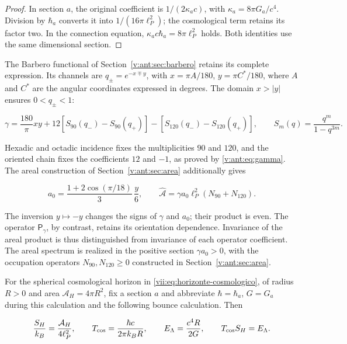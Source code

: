 \begin{proof}
In section \(a\), the original coefficient is \(1/(2\kappa_a c)\), with \(\kappa_a=8\pi G_a/c^4\). Division by \(\hbar_a\) converts it into \(1/(16\pi\ell_P^2)\); the cosmological term retains its factor two. In the connection equation, \(\kappa_a c\hbar_a=8\pi\ell_P^2\) holds. Both identities use the same dimensional section.
\end{proof}

The Barbero functional of Section~\ref{v:ant:sec:barbero} retains its complete expression. Its channels are \(q_\pm=e^{-x\mp y}\), with \(x=\pi A/180\), \(y=\pi C^*/180\), where \(A\) and \(C^*\) are the angular coordinates expressed in degrees. The domain \(x>|y|\) ensures \(0<q_\pm<1\):

\begin{equation}
\gamma=\frac{180}{\pi}xy+
12[S_{90}(q_-)-S_{90}(q_+)]
-[S_{120}(q_-)-S_{120}(q_+)],\qquad
S_m(q)=\frac{q^m}{1-q^{3m}}.
\label{nuc12:eq:4.4}
\end{equation}

Hexadic and octadic incidence fixes the multiplicities \(90\) and \(120\), and the oriented chain fixes the coefficients \(12\) and \(-1\), as proved by \eqref{v:ant:eq:gamma}. The areal construction of Section~\ref{v:ant:sec:area} additionally gives

\begin{equation}
a_0=\frac{1+2\cos(\pi/18)}3\,\frac y6,\qquad
\widehat{\mathcal A}=\gamma a_0\ell_P^2(N_{90}+N_{120}).
\label{nuc12:eq:4.5}
\end{equation}

The inversion \(y\mapsto-y\) changes the signs of \(\gamma\) and \(a_0\); their product is even. The operator \(\mathsf P_\gamma\), by contrast, retains its orientation dependence. Invariance of the areal product is thus distinguished from invariance of each operator coefficient. The areal spectrum is realized in the positive section \(\gamma a_0>0\), with the occupation operators \(N_{90},N_{120}\geq0\) constructed in Section~\ref{v:ant:sec:area}.

For the spherical cosmological horizon in \eqref{vii:eq:horizonte-cosmologico}, of radius \(R>0\) and area \(\mathcal A_H=4\pi R^2\), fix a section \(a\) and abbreviate \(\hbar=\hbar_a\), \(G=G_a\) during this calculation and the following bounce calculation. Then

\begin{equation}
\frac{S_H}{k_B}=\frac{\mathcal A_H}{4\ell_P^2},\qquad
T_{\rm cos}=\frac{\hbar c}{2\pi k_BR},\qquad
E_\Lambda=\frac{c^4R}{2G},\qquad T_{\rm cos}S_H=E_\Lambda .
\label{nuc12:eq:4.6}
\end{equation}

